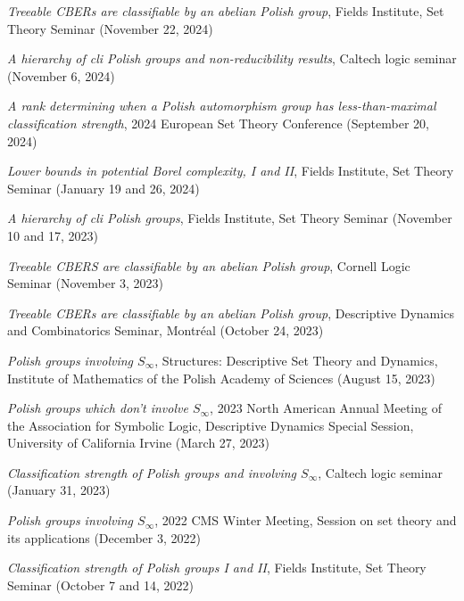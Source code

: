 \documentclass[letterpaper]{article}
\renewenvironment{itemize}{
  \begin{list}{}{
    \setlength{\leftmargin}{1.5em}
  }
}{
  \end{list}
}
\begin{document}
\begin{itemize}
    \item \emph{Treeable CBERs are classifiable by an abelian Polish group}, Fields Institute, Set Theory Seminar (November 22, 2024)
    
    \item \emph{A hierarchy of cli Polish groups and non-reducibility results}, Caltech logic seminar (November 6, 2024)

    \item \emph{A rank determining when a Polish automorphism group has less-than-maximal classification strength}, 2024 European Set Theory Conference (September 20, 2024)

    \item \emph{Lower bounds in potential Borel complexity, I and II}, Fields Institute, Set Theory Seminar (January 19 and 26, 2024)

    \item \emph{A hierarchy of cli Polish groups}, Fields Institute, Set Theory Seminar (November 10 and 17, 2023)

    \item \emph{Treeable CBERS are classifiable by an abelian Polish group}, Cornell Logic Seminar (November 3, 2023)

    \item \emph{Treeable CBERs are classifiable by an abelian Polish group}, Descriptive Dynamics and Combinatorics Seminar, Montr\'eal (October 24, 2023)

    \item \emph{Polish groups involving $S_\infty$}, Structures: Descriptive Set Theory and Dynamics, Institute of Mathematics of the Polish Academy of Sciences (August 15, 2023)

    \item \emph{Polish groups which don't involve $S_\infty$}, 2023 North American Annual Meeting of the Association for Symbolic Logic, Descriptive Dynamics Special Session, University of California Irvine (March 27, 2023)

    \item \emph{Classification strength of Polish groups and involving $S_\infty$}, Caltech logic seminar (January 31, 2023)
    
    \item \emph{Polish groups involving $S_\infty$}, 2022 CMS Winter Meeting, Session on set theory and its applications (December 3, 2022)
    
    \item \emph{Classification strength of Polish groups I and II}, Fields Institute, Set Theory Seminar (October 7 and 14, 2022)
    

\end{itemize}
\end{document}
